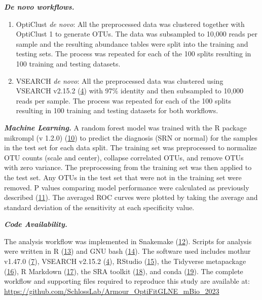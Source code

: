 \documentclass[
]{article}
\begin{document}
\textbf{\emph{De novo workflows.}}

\begin{enumerate}
\def\labelenumi{\arabic{enumi}.}
\setcounter{enumi}{3}
\item
  OptiClust \emph{de novo}: All the preprocessed data was clustered
  together with OptiClust 1 to generate OTUs. The data was subsampled to
  10,000 reads per sample and the resulting abundance tables were split
  into the training and testing sets. The process was repeated for each
  of the 100 splits resulting in 100 training and testing datasets.
\item
  VSEARCH \emph{de novo}: All the preprocessed data was clustered using
  VSEARCH v2.15.2 (\protect\hyperlink{ref-rognes2016}{4}) with 97\%
  identity and then subsampled to 10,000 reads per sample. The process
  was repeated for each of the 100 splits resulting in 100 training and
  testing datasets for both workflows.
\end{enumerate}

\textbf{\emph{Machine Learning.}} A random forest model was trained with
the R package mikrompl (v 1.2.0)
(\protect\hyperlink{ref-topuxe7uoglu2021}{10}) to predict the diagnosis
(SRN or normal) for the samples in the test set for each data split. The
training set was preprocessed to normalize OTU counts (scale and
center), collapse correlated OTUs, and remove OTUs with zero variance.
The preprocessing from the training set was then applied to the test
set. Any OTUs in the test set that were not in the training set were
removed. P values comparing model performance were calculated as
previously described (\protect\hyperlink{ref-topuxe7uoglu2020}{11}). The
averaged ROC curves were plotted by taking the average and standard
deviation of the sensitivity at each specificity value.

\textbf{\emph{Code Availability.}}

The analysis workflow was implemented in Snakemake
(\protect\hyperlink{ref-koster2012}{12}). Scripts for analysis were
written in R (\protect\hyperlink{ref-R2020}{13}) and GNU bash
(\protect\hyperlink{ref-GNUbash}{14}). The software used includes mothur
v1.47.0 (\protect\hyperlink{ref-schloss2009}{7}), VSEARCH v2.15.2
(\protect\hyperlink{ref-rognes2016}{4}), RStudio
(\protect\hyperlink{ref-RStudio2019}{15}), the Tidyverse metapackage
(\protect\hyperlink{ref-wickham2019}{16}), R Markdown
(\protect\hyperlink{ref-xie_r_2018}{17}), the SRA toolkit
(\protect\hyperlink{ref-noauthor_sra-tools_nodate}{18}), and conda
(\protect\hyperlink{ref-noauthor_anaconda_2016}{19}). The complete
workflow and supporting files required to reproduce this study are
available at:
\url{https://github.com/SchlossLab/Armour_OptiFitGLNE_mBio_2023}
\end{document}
